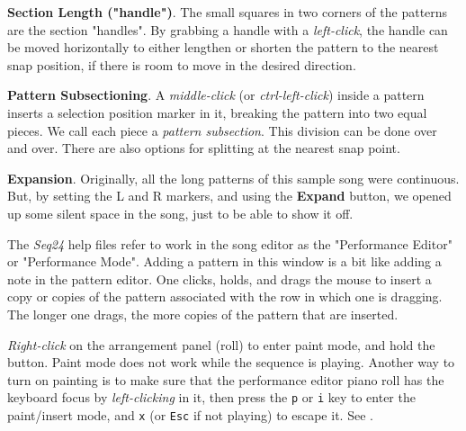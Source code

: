 \begin{enumber}
      \item \textbf{Section Length ("handle")}.
         The small squares in two corners of the patterns are the section
         "handles".
         By grabbing a handle with a \textsl{left-click},
         the handle can be moved
         horizontally to either lengthen or shorten the pattern to the nearest
         snap position, if there is room to move in the desired direction.
      \item \textbf{Pattern Subsectioning}.
         A \textsl{middle-click} (or \textsl{ctrl-left-click})
         inside a pattern inserts a selection position
         marker in it, breaking the pattern into two equal pieces.
         We call each piece a \textsl{pattern subsection}.
         This division can be done over and over.
         There are also options for splitting at the nearest snap point.
      \item \textbf{Expansion}.
         Originally, all the long patterns of this sample song were continuous.
         But, by setting the L and R markers, and using the \textbf{Expand}
         button, we opened up some silent space in the song, just to be able
         to show it off.
   \end{enumber}

   The \textsl{Seq24} help files refer to work in the song editor as the
   "Performance Editor" or "Performance Mode".  Adding a pattern in this
   window is a bit like adding a note in the pattern editor.
   One clicks, holds, and drags the mouse to insert a copy or copies of the
   pattern associated with the row in which one is dragging.
   The longer one drags, the more copies of the pattern that are inserted.

   \textsl{Right-click} on the arrangement panel (roll) to enter
   paint mode, and hold the button.
   Paint mode does not work while the sequence is playing.
   Another way to turn on painting is to
   make sure that the performance editor piano roll has the
   keyboard focus by \textsl{left-clicking} in it, then press the
   \texttt{p} or \texttt{i} key to enter the paint/insert mode, and
   \texttt{x} (or \texttt{Esc} if not playing) to escape it.
   See .

